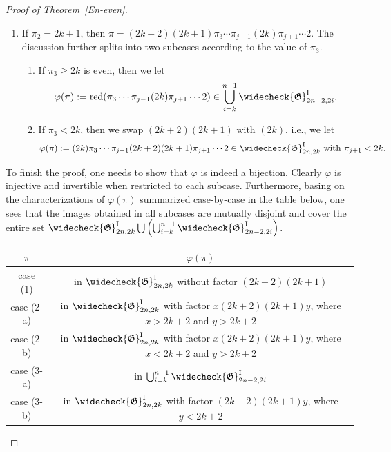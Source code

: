 \documentclass[11pt,reqno]{amsart}
\numberwithin{equation}{section}
\theoremstyle{plain}
\theoremstyle{definition}
\newcommand{\fG}{\mathfrak{G}}
\newcommand{\cGI}{\widecheck{\fG}^{\mathrm{I}}}
\def\re{\mathrm{red}}
\begin{document}
\begin{proof}[Proof of Theorem~\ref{En-even}]
\begin{enumerate}[label=(\arabic*)]
		\item If $\pi_2=2k+1$, then $\pi =(2k+2)(2k+1)\pi_3\cdots \pi_{j-1}(2k)\pi_{j+1}\cdots 2$. The discussion further splits into two subcases according to the value of $\pi_3$.
		\begin{enumerate}
			\item If $\pi_3\ge 2k$ is even, then we let
			$$\varphi(\pi):=\re(\pi_3\cdots \pi_{j-1}(2k)\pi_{j+1}\cdots 2)\in \bigcup_{i=k}^{n-1}\cGI_{2n-2,2i}.$$
			\item If $\pi_3<2k$, then we swap $(2k+2)(2k+1)$ with $(2k)$, i.e., we let
			$$\varphi(\pi):=(2k)\pi_3\cdots \pi_{j-1}(2k+2)(2k+1)\pi_{j+1}\cdots 2 \in\cGI_{2n,2k} \text{ with $\pi_{j+1}<2k$.}$$
		\end{enumerate}
	\end{enumerate}
	To finish the proof, one needs to show that $\varphi$ is indeed a bijection. Clearly $\varphi$ is injective and invertible when restricted to each subcase. Furthermore, basing on the characterizations of $\varphi(\pi)$ summarized case-by-case in the table below, one sees that the images obtained in all subcases are mutually disjoint and cover the entire set $\cGI_{2n,2k}\bigcup\left(\bigcup_{i=k}^{n-1}\cGI_{2n-2,2i}\right)$.

	\begin{table}[!ht]
		\renewcommand{\arraystretch}{1.5}
		\centering
		\begin{tabular}{c|c}
			$\pi$ & $\varphi(\pi)$ \\ \hline
			case (1) & in $\cGI_{2n,2k}$ without factor $(2k+2)(2k+1)$ \\ 
			case (2-a) & in $\cGI_{2n,2k}$ with factor $x(2k+2)(2k+1)y$, where $x>2k+2$ and $y>2k+2$ \\ 
			case (2-b) & in $\cGI_{2n,2k}$ with factor $x(2k+2)(2k+1)y$, where $x<2k+2$ and $y>2k+2$ \\ 
			case (3-a) & in $\bigcup_{i=k}^{n-1}\cGI_{2n-2,2i}$ \\ 
			case (3-b) & in $\cGI_{2n,2k}$ with factor $(2k+2)(2k+1)y$, where $y<2k+2$   
		\end{tabular}
	\end{table}
\end{proof}
\end{document}
